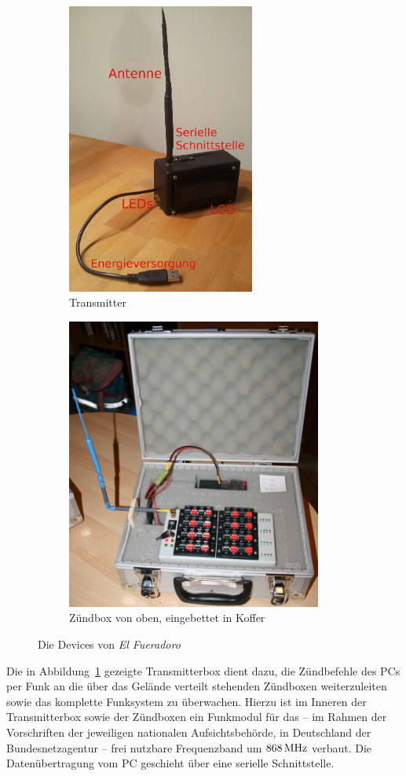 \documentclass[pdftex, parskip, numbers=noenddot, toc=listof]{scrbook}
\newcommand{\anlage}{\emph{El Fueradoro}}
\begin{document}
			\begin{figure}
				\centering
				\begin{subfigure}[t]{0.405\textwidth}
					\includegraphics[height=96mm]{Bilder/Transmitter}
					\caption{Transmitter}
					\label{fig:transmitter}
				\end{subfigure}
				\begin{subfigure}[t]{0.55\textwidth}
					\includegraphics[height=96mm]{Bilder/DraufsichtZuendbox}
					\caption{Zündbox von oben, eingebettet in Koffer}
					\label{fig:zuendbox}
				\end{subfigure}%
				\caption{Die Devices von {\anlage}}
			\end{figure}

			Die in Abbildung~\ref{fig:transmitter} gezeigte Transmitterbox dient dazu, die Zündbefehle des PCs per Funk an die über das Gelände verteilt stehenden Zündboxen weiterzuleiten sowie das komplette Funksystem zu überwachen. Hierzu ist im Inneren der Transmitterbox sowie der Zündboxen ein Funkmodul für das -- im Rahmen der Vorschriften der jeweiligen nationalen Aufsichtsbehörde, in Deutschland der Bundesnetzagentur -- frei nutzbare Frequenzband um $\unit[868]{MHz}$ verbaut. Die Datenübertragung vom PC geschieht über eine serielle Schnittstelle.
\end{document}
